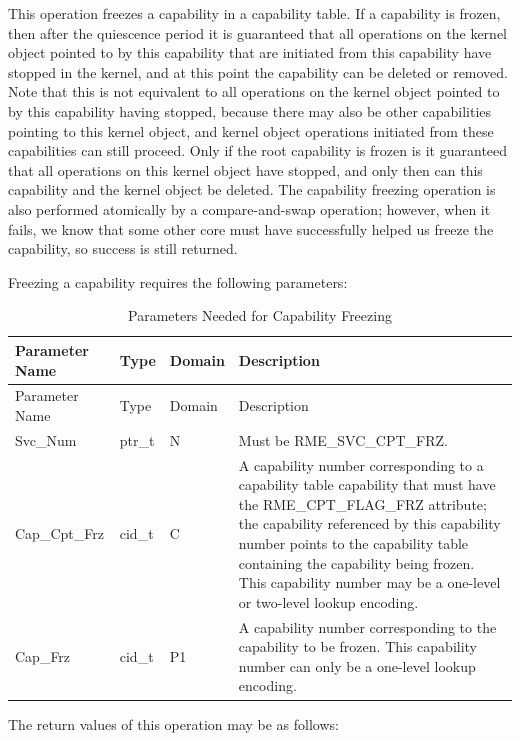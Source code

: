 This operation freezes a capability in a capability table. If a capability is frozen, then after the quiescence period it is guaranteed that all operations on the kernel object pointed to by this capability that are initiated from this capability have stopped in the kernel, and at this point the capability can be deleted or removed. Note that this is not equivalent to all operations on the kernel object pointed to by this capability having stopped, because there may also be other capabilities pointing to this kernel object, and kernel object operations initiated from these capabilities can still proceed. Only if the root capability is frozen is it guaranteed that all operations on this kernel object have stopped, and only then can this capability and the kernel object be deleted. The capability freezing operation is also performed atomically by a compare-and-swap operation; however, when it fails, we know that some other core must have successfully helped us freeze the capability, so success is still returned.

Freezing a capability requires the following parameters:

\begin{xltabular}{\textwidth}{@{}>{\hsize\raggedright\arraybackslash}X>{\hsize\raggedright\arraybackslash}X>{\hsize\raggedright\arraybackslash}X>{\hsize\raggedright\arraybackslash}X@{}}
\caption{Parameters Needed for Capability Freezing}\label{tab:2-11-capability-freeze-parameters}\\
\toprule
Parameter Name & Type & Domain & Description\tabularnewline
\endfirsthead
\toprule
Parameter Name & Type & Domain & Description\tabularnewline
\midrule
\endhead
\bottomrule
\endlastfoot
Svc\_Num & ptr\_t & N & Must be RME\_SVC\_CPT\_FRZ.\tabularnewline
Cap\_Cpt\_Frz & cid\_t & C &
A capability number corresponding to a capability table capability that must have the RME\_CPT\_FLAG\_FRZ attribute; the capability referenced by this capability number points to the capability table containing the capability being frozen. This capability number may be a one-level or two-level lookup encoding.\tabularnewline
Cap\_Frz & cid\_t & P1 &
A capability number corresponding to the capability to be frozen. This capability number can only be a one-level lookup encoding.\tabularnewline
\end{xltabular}
\nopagebreak[4]

The return values of this operation may be as follows:

